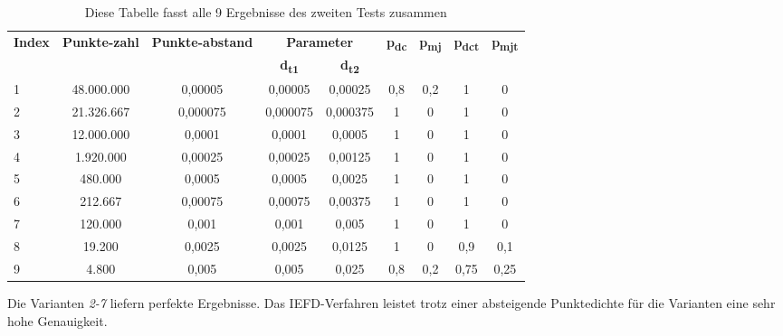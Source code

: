 \begin{table}[b]
	\centering
	\begin{tabular}[width = \textwidth]{l *{8}{c}}
		\hline
		\multirow{2}{2em}{\textbf{Index}} & \multirow{2}{3em}{\textbf{Punkte-zahl}} & \multirow{2}{3em}{\textbf{Punkte-abstand}} & \multicolumn{2}{c}{\textbf{Parameter}} & \multirow{2}{*}{\textbf{p\textsubscript{dc}}} & \multirow{2}{*}{\textbf{p\textsubscript{mj}}} & \multirow{2}{*}{\textbf{p\textsubscript{dct}}} & \multirow{2}{*}{\textbf{p\textsubscript{mjt}}} \\
		& & & \textbf{d\textsubscript{t1}} &\textbf{d\textsubscript{t2}} & & & & \\
		\hline
		1 & 48.000.000 & 0,00005 & 0,00005 & 0,00025 & 0,8 & 0,2 & 1 & 0 \\
		2 & 21.326.667 & 0,000075 & 0,000075 & 0,000375 & 1 & 0 & 1 & 0 \\
		3 & 12.000.000 & 0,0001 & 0,0001 & 0,0005 & 1 & 0 & 1 & 0 \\
		4 & 1.920.000 & 0,00025 & 0,00025 & 0,00125 & 1 & 0 & 1 & 0 \\
		5 & 480.000 & 0,0005 & 0,0005 & 0,0025 & 1 & 0 & 1 & 0 \\
		6 & 212.667 & 0,00075 & 0,00075 & 0,00375 & 1 & 0 & 1 & 0 \\
		7 & 120.000 & 0,001	& 0,001 & 0,005 & 1 & 0 & 1 & 0 \\
		8 & 19.200 & 0,0025 & 0,0025 & 0,0125 & 1 & 0 & 0,9 & 0,1 \\
		9 & 4.800 & 0,005 & 0,005 & 0,025 & 0,8 & 0,2 & 0,75 & 0,25 \\
		\hline 
	\end{tabular}
	\caption{Diese Tabelle fasst alle 9 Ergebnisse des zweiten Tests zusammen}
	\label{table: test_2_results}
\end{table}

Die Varianten \textit{2-7} liefern perfekte Ergebnisse. Das IEFD-Verfahren leistet trotz einer absteigende Punktedichte für die Varianten eine sehr hohe Genauigkeit.